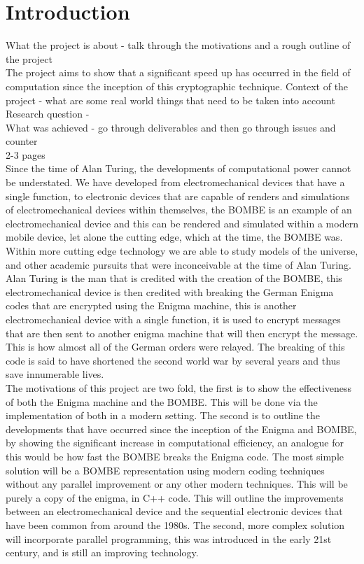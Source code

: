 \documentclass[12pt,a4paper]{article}
\begin{document}
\section{Introduction}

What the project is about - talk through the motivations and a rough outline of the project\\
The project aims to show that a significant speed up has occurred in the field of computation since the inception of this cryptographic technique.
Context of the project - what are some real world things that need to be taken into account\\
Research question - \\
What was achieved - go through deliverables and then go through issues and counter\\
2-3 pages\\

Since the time of Alan Turing, the developments of computational power cannot be understated. We have developed from electromechanical devices that have a single function, to electronic devices that are capable of renders and simulations of electromechanical devices within themselves, the BOMBE is an example of an electromechanical device and this can be rendered and simulated within a modern mobile device, let alone the cutting edge, which at the time, the BOMBE was. Within more cutting edge technology we are able to study models of the universe, and other academic pursuits that were inconceivable at the time of Alan Turing.\\
Alan Turing is the man that is credited with the creation of the BOMBE, this electromechanical device is then credited with breaking the German Enigma codes that are encrypted using the Enigma machine, this is another electromechanical device with a single function, it is used to encrypt messages that are then sent to another enigma machine that will then encrypt the message. This is how almost all of the German orders were relayed. The breaking of this code is said to have shortened the second world war by several years and thus save innumerable lives.\\
The motivations of this project are two fold, the first is to show the effectiveness of both the Enigma machine and the BOMBE. This will be done via the implementation of both in a modern setting. The second is to outline the developments that have occurred since the inception of the Enigma and BOMBE, by showing the significant increase in computational efficiency, an analogue for this would be how fast the BOMBE breaks the Enigma code. The most simple solution will be a BOMBE representation using modern coding techniques without any parallel improvement or any other modern techniques. This will be purely a copy of the enigma, in C++ code. This will outline the improvements between an electromechanical device and the sequential electronic devices that have been common from around the 1980s. The second, more complex solution will incorporate parallel programming, this was introduced in the early 21st century, and is still an improving technology.\\
\end{document}
